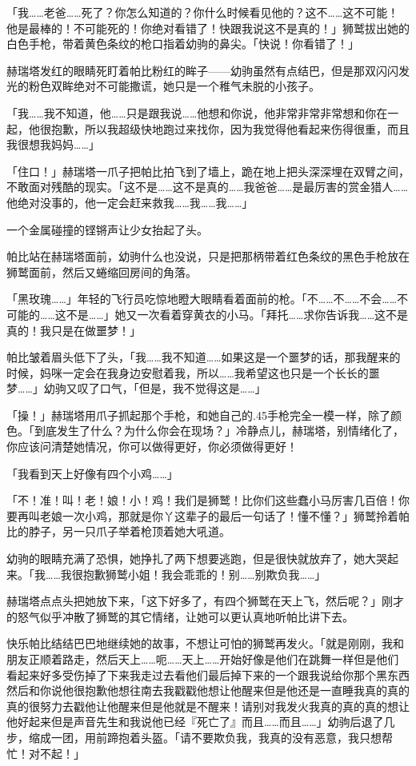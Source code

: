 「我……老爸……死了？你怎么知道的？你什么时候看见他的？这不……这不可能！他是最棒的！不可能死的！你绝对看错了！快跟我说这不是真的！」狮鹫拔出她的白色手枪，带着黄色条纹的枪口指着幼驹的鼻尖。「快说！你看错了！」

赫瑞塔发红的眼睛死盯着帕比粉红的眸子——幼驹虽然有点结巴，但是那双闪闪发光的粉色双眸绝对不可能撒谎，她只是一个稚气未脱的小孩子。

「我……我不知道，他……只是跟我说……他想和你说，他非常非常非常想和你在一起，他很抱歉，所以我超级快地跑过来找你，因为我觉得他看起来伤得很重，而且我很想我妈妈……」

「住口！」赫瑞塔一爪子把帕比拍飞到了墙上，跪在地上把头深深埋在双臂之间，不敢面对残酷的现实。「这不是……这不是真的……我爸爸……是最厉害的赏金猎人……他绝对没事的，他一定会赶来救我……我……我……」

一个金属碰撞的铿锵声让少女抬起了头。

帕比站在赫瑞塔面前，幼驹什么也没说，只是把那柄带着红色条纹的黑色手枪放在狮鹫面前，然后又蜷缩回房间的角落。

「黑玫瑰……」年轻的飞行员吃惊地瞪大眼睛看着面前的枪。「不……不……不会……不可能的……这不是……」她又一次看着穿黄衣的小马。「拜托……求你告诉我……这不是真的！我只是在做噩梦！」

帕比皱着眉头低下了头，「我……我不知道……如果这是一个噩梦的话，那我醒来的时候，妈咪一定会在我身边安慰着我，所以……我希望这也只是一个长长的噩梦……」幼驹又叹了口气，「但是，我不觉得这是……」

「操！」赫瑞塔用爪子抓起那个手枪，和她自己的.45手枪完全一模一样，除了颜色。「到底发生了什么？为什么你会在现场？」冷静点儿，赫瑞塔，别情绪化了，你应该问清楚她情况，你可以做得更好，你必须做得更好！

「我看到天上好像有四个小鸡……」

「不！准！叫！老！娘！小！鸡！我们是狮鹫！比你们这些蠢小马厉害几百倍！你要再叫老娘一次小鸡，那就是你丫这辈子的最后一句话了！懂不懂？」狮鹫拎着帕比的脖子，另一只爪子举着枪顶着她大吼道。

幼驹的眼睛充满了恐惧，她挣扎了两下想要逃跑，但是很快就放弃了，她大哭起来。「我……我很抱歉狮鹫小姐！我会乖乖的！别……别欺负我……」

赫瑞塔点点头把她放下来，「这下好多了，有四个狮鹫在天上飞，然后呢？」刚才的怒气似乎冲散了狮鹫的其它情绪，让她可以更认真地听帕比讲下去。

快乐帕比结结巴巴地继续她的故事，不想让可怕的狮鹫再发火。「就是刚刚，我和朋友正顺着路走，然后天上……呃……天上……开始好像是他们在跳舞一样但是他们看起来好多受伤掉了下来我走过去看他们最后掉下来的一个跟我说给你那个黑东西然后和你说他很抱歉他想往南去我戳戳他想让他醒来但是他还是一直睡我真的真的真的很努力去戳他让他醒来但是他就是不醒来！请别对我发火我真的真的真的想让他好起来但是声音先生和我说他已经『死亡了』而且……而且……」幼驹后退了几步，缩成一团，用前蹄抱着头盔。「请不要欺负我，我真的没有恶意，我只想帮忙！对不起！」

